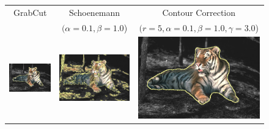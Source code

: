 \documentclass[smallextended]{svjour3}       %
\begin{document}
{{\begin{figure}[ht!]
	\center
	\begin{tabular}{ccc}
		GrabCut & Schoenemann & Contour Correction \\
		& $(\alpha=0.1, \beta=1.0$) & $(r=5, \alpha=0.1, \beta=1.0, \gamma=3.0$)\\
		\includegraphics[scale=0.2]{images/segmentation/bc/tiger1/gc-seg.png} &
	\includegraphics[scale=0.2]{images/segmentation/schoenemann/tiger1/tiger1-seg.png}&
		\includegraphics[scale=0.2]{images/segmentation/bc/tiger1/corrected-seg.png}\\									

\end{tabular}
\end{figure}}}
\end{document}
